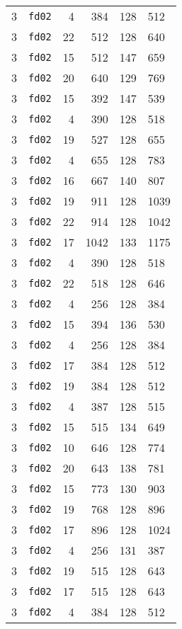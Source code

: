 \documentclass{article}
\begin{document}
\begin{table}[h!]
\begin{tabular}{llrrrl}
    3 & \texttt{fd02} & 4 & 384 & 128 & 512 \\
    3 & \texttt{fd02} & 22 & 512 & 128 & 640 \\
    3 & \texttt{fd02} & 15 & 512 & 147 & 659 \\
    3 & \texttt{fd02} & 20 & 640 & 129 & 769 \\
    3 & \texttt{fd02} & 15 & 392 & 147 & 539 \\
    3 & \texttt{fd02} & 4 & 390 & 128 & 518 \\
    3 & \texttt{fd02} & 19 & 527 & 128 & 655 \\
    3 & \texttt{fd02} & 4 & 655 & 128 & 783 \\
    3 & \texttt{fd02} & 16 & 667 & 140 & 807 \\
    3 & \texttt{fd02} & 19 & 911 & 128 & 1039 \\
    3 & \texttt{fd02} & 22 & 914 & 128 & 1042 \\
    3 & \texttt{fd02} & 17 & 1042 & 133 & 1175 \\
    3 & \texttt{fd02} & 4 & 390 & 128 & 518 \\
    3 & \texttt{fd02} & 22 & 518 & 128 & 646 \\
    3 & \texttt{fd02} & 4 & 256 & 128 & 384 \\
    3 & \texttt{fd02} & 15 & 394 & 136 & 530 \\
    3 & \texttt{fd02} & 4 & 256 & 128 & 384 \\
    3 & \texttt{fd02} & 17 & 384 & 128 & 512 \\
    3 & \texttt{fd02} & 19 & 384 & 128 & 512 \\
    3 & \texttt{fd02} & 4 & 387 & 128 & 515 \\
    3 & \texttt{fd02} & 15 & 515 & 134 & 649 \\
    3 & \texttt{fd02} & 10 & 646 & 128 & 774 \\
    3 & \texttt{fd02} & 20 & 643 & 138 & 781 \\
    3 & \texttt{fd02} & 15 & 773 & 130 & 903 \\
    3 & \texttt{fd02} & 19 & 768 & 128 & 896 \\
    3 & \texttt{fd02} & 17 & 896 & 128 & 1024 \\
    3 & \texttt{fd02} & 4 & 256 & 131 & 387 \\
    3 & \texttt{fd02} & 19 & 515 & 128 & 643 \\
    3 & \texttt{fd02} & 17 & 515 & 128 & 643 \\
    3 & \texttt{fd02} & 4 & 384 & 128 & 512 \\

\end{tabular}
\end{table}
\end{document}

